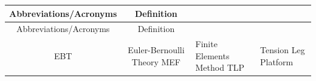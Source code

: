 \makeatletter
    \setlength{\absparsep}{18pt}
\makeatother

\begin{center}
    \textbf{\acrotitle}
\end{center}
\vspace{.5cm}

\begin{longtable}{cc}

\hline
Abbreviations/Acronyms & Definition\\
\hline
\endfirsthead

\hline
Abbreviations/Acronyms & Definition\\
\hline
\endhead

\hline
\endfoot

\hline
\endlastfoot
    EBT & Euler-Bernoulli Theory
    MEF & Finite Elements Method
    TLP & Tension Leg Platform
\end{longtable}
\setcounter{table}{0}